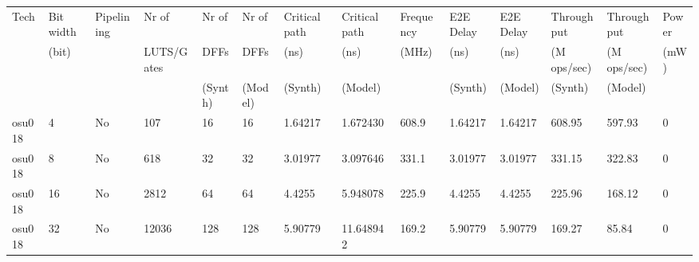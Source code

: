 \begin{tabular}{llllllllllllll}
\hline
\hline
 {Tech}   & {Bit width} & {Pipelining} & {Nr of}      & {Nr of}   & {Nr of}   & {Critical path} & {Critical path} & {Frequency} & {E2E Delay} & {E2E Delay} & {Throughput}  & {Throughput}  & {Power} \\
          & {(bit)}     &              & {LUTS/Gates} & {DFFs}    & {DFFs}    & {(ns)}          & {(ns)}          & {(MHz)}     & {(ns)}      & {(ns)}      & {(M ops/sec)} & {(M ops/sec)} & {(mW)}  \\
          &             &              &              & {(Synth)} & {(Model)} & {(Synth)}       & {(Model)}       &             & {(Synth)}   & {(Model)}   & {(Synth)}     & {(Model)}     &         \\
 {osu018} & 4           & {No}         & 107          & 16        & 16        & 1.64217         & 1.672430        & 608.9       & 1.64217     & 1.64217     & 608.95        & 597.93        & 0       \\
 {osu018} & 8           & {No}         & 618          & 32        & 32        & 3.01977         & 3.097646        & 331.1       & 3.01977     & 3.01977     & 331.15        & 322.83        & 0       \\
 {osu018} & 16          & {No}         & 2812         & 64        & 64        & 4.4255          & 5.948078        & 225.9       & 4.4255      & 4.4255      & 225.96        & 168.12        & 0       \\
 {osu018} & 32          & {No}         & 12036        & 128       & 128       & 5.90779         & 11.648942       & 169.2       & 5.90779     & 5.90779     & 169.27        & 85.84         & 0       \\
\hline
\end{tabular}
